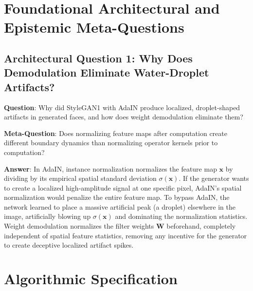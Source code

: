 \documentclass[11pt,a4paper]{article}
\theoremstyle{definition}
\begin{document}
\section{Foundational Architectural and Epistemic Meta-Questions}

\subsection{Architectural Question 1: Why Does Demodulation Eliminate Water-Droplet Artifacts?}
\textbf{Question}: Why did StyleGAN1 with AdaIN produce localized, droplet-shaped artifacts in generated faces, and how does weight demodulation eliminate them?

\textbf{Meta-Question}: Does normalizing feature maps after computation create different boundary dynamics than normalizing operator kernels prior to computation?

\textbf{Answer}: In AdaIN, instance normalization normalizes the feature map $\mathbf{x}$ by dividing by its empirical spatial standard deviation $\sigma(\mathbf{x})$. If the generator wants to create a localized high-amplitude signal at one specific pixel, AdaIN's spatial normalization would penalize the entire feature map. To bypass AdaIN, the network learned to place a massive artificial peak (a droplet) elsewhere in the image, artificially blowing up $\sigma(\mathbf{x})$ and dominating the normalization statistics. Weight demodulation normalizes the filter weights $\mathbf{W}$ beforehand, completely independent of spatial feature statistics, removing any incentive for the generator to create deceptive localized artifact spikes.

\section{Algorithmic Specification}
\end{document}

